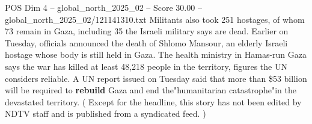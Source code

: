 \begin{textsample}{POS Dim 4 – global\_north\_2025\_02 – Score 30.00 – global\_north\_2025\_02/121141310.txt}
Militants also took 251 hostages, of whom 73 remain in Gaza, including 35 the Israeli military says are dead.
Earlier on Tuesday, officials announced the death of Shlomo Mansour, an elderly Israeli hostage whose body is still held in Gaza.
The health ministry in Hamas-run Gaza says the war has killed at least 48,218 people in the territory, figures the UN considers reliable.
A UN report issued on Tuesday said that more than \$53 billion will be required to \textbf{rebuild} Gaza and end the"humanitarian catastrophe"in the devastated territory. ( Except for the headline, this story has not been edited by NDTV staff and is published from a syndicated feed. )

\end{textsample}
